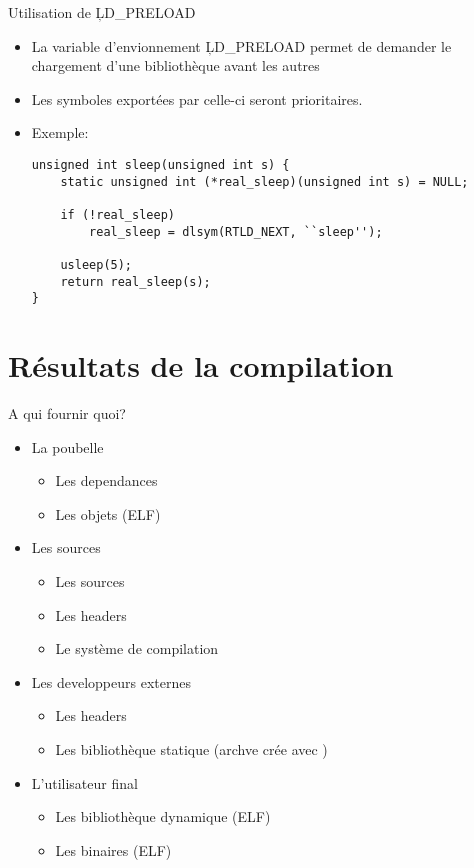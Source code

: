 \begin{frame}[fragile=singleslide]{Utilisation de \c{LD_PRELOAD}}
  \begin{itemize}
  \item La  variable d'envionnement \c{LD_PRELOAD}  permet de demander
    le chargement d'une bibliothèque avant les autres
  \item Les symboles exportées par celle-ci seront prioritaires.
  \item Exemple:
    \begin{lstlisting}
unsigned int sleep(unsigned int s) {
    static unsigned int (*real_sleep)(unsigned int s) = NULL;

    if (!real_sleep)
        real_sleep = dlsym(RTLD_NEXT, ``sleep'');

    usleep(5);
    return real_sleep(s);
}
    \end{lstlisting}
  \end{itemize}
\end{frame}

\section{Résultats de la compilation}

\begin{frame}[fragile=singleslide]{A qui fournir quoi?}
  \begin{itemize}
  \item La poubelle
    \begin{itemize}
    \item Les dependances
    \item Les objets (ELF)
    \end{itemize}
  \item Les sources
    \begin{itemize}
    \item Les sources
    \item Les headers
    \item Le système de compilation
    \end{itemize}
  \item Les developpeurs externes
    \begin{itemize}
    \item Les headers
    \item Les bibliothèque statique (archve crée avec )
    \end{itemize}
  \item L'utilisateur final
    \begin{itemize}
    \item Les bibliothèque dynamique (ELF)
    \item Les binaires (ELF)
    \end{itemize}
  \end{itemize}
\end{frame}

